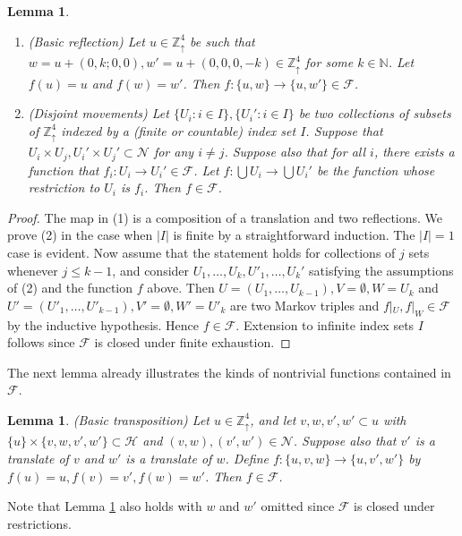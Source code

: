 \documentclass[aop, preprint]{imsart}
\theoremstyle{plain}
\newtheorem{lemma}[theorem]{Lemma}
\theoremstyle{definition}
\theoremstyle{plain}
\newcommand{\N}{\mathbb{N}}
\newcommand{\sset}{\subset}
\newcommand{\Zd}{\mathds{Z}^4_\uparrow}
\newcommand{\scrH}{\mathcal{H}}
\newcommand{\scrN}{\mathcal{N}}
\newcommand{\scrF}{\mathcal{F}}
\newcommand{\X}{\times}
\begin{document}
\begin{lemma}
	\label{L:in-F-triv}
	\begin{enumerate}
		\item (Basic reflection) Let $u \in \Zd$ be such that $w = u + (0, k; 0,0), w' = u + (0, 0, 0, -k) \in \Zd$ for some $k \in \N$. Let $f(u) = u$ and $f(w) = w'$. Then $f:\{u, w\} \to \{u, w'\} \in \scrF$.
		\item (Disjoint movements) Let $\{U_i : i \in I\}, \{U_i' : i \in I\}$ be two collections of subsets of $\Zd$ indexed by a (finite or countable) index set $I$. Suppose that $U_i \X U_j, U_i' \X U_j' \sset \scrN$ for any $i \ne j$. Suppose also that for all $i$, there exists a function that $f_i: U_i \to U_i' \in \scrF$. Let $f:\bigcup U_i \to \bigcup U_i'$ be the function whose restriction to $U_i$ is $f_i$. Then $f \in \scrF$.
	\end{enumerate}
\end{lemma}


\begin{proof}
	The map in (1) is a composition of a translation and two reflections. We prove (2) in the case when $|I|$ is finite by a straightforward induction. The $|I|=1$ case is evident. Now assume that the statement holds for collections of $j$ sets whenever $j \le k-1$, and consider $U_1, \dots, U_k, U'_1, \dots, U_k'$ satisfying the assumptions of (2) and the function $f$ above. Then $U = (U_1, \dots, U_{k-1}), V = \emptyset, W = U_k$ and $U' = (U'_1, \dots, U'_{k-1}), V' = \emptyset, W' = U'_k$ are two Markov triples and $f|_U, f|_W \in \scrF$ by the inductive hypothesis. Hence $f \in \scrF$. Extension to infinite index sets $I$ follows since $\scrF$ is closed under finite exhaustion.
\end{proof}

The next lemma already illustrates the kinds of nontrivial functions contained in $\scrF$.

\begin{lemma}
	\label{L:G-moves} (Basic transposition)
	Let $u \in \Zd$, and let $v, w, v', w' \sset u$ with $\{u\} \X \{v, w, v', w'\} \sset \scrH$ and $(v, w), (v', w') \in \scrN$. Suppose also that $v'$ is a translate of $v$ and $w'$ is a translate of $w$. Define $f:\{u, v, w\} \to \{u, v', w'\}$ by $f(u) = u, f(v) = v', f(w) = w'$. Then $f \in \scrF$.
\end{lemma}

Note that Lemma \ref{L:G-moves} also holds with $w$ and $w'$ omitted since $\scrF$ is closed under restrictions. 
\end{document}
